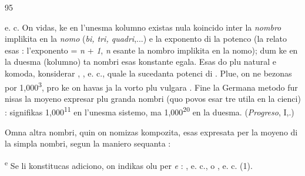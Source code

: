 \begin{VUpage}[99]{95}

\VUcontinue
e. c. On vidas, ke en l'unesma kolumno existas nula koincido\nl
inter la \textit{nombro} implikita en la \textit{nomo} (\textit{bi, tri, quadri},...) e\nl
la exponento di la potenco (la relato esas : l'exponento =\nl
\textit{n} + \textit{1}, \textit{n} esante la nombro implikita en la nomo); dum ke\nl
en la duesma (kolumno) ta nombri esas konstante egala.\nl
Esas do plu natural e komoda, konsiderar , \cc
{}, e. c., quale la sucedanta potenci di . Plue,\nl
on ne bezonas  por 1,000\textsuperscript{3}, pro ke on havas ja la\nl
vorto plu vulgara . Fine la Germana metodo fur\cc
nisas la moyeno expresar plu granda nombri (quo povos\nl
esar tre utila en la cienci) :  signifikas 1,000\textsuperscript{11} en\nl
l'unesma sistemo, ma 1,000\textsuperscript{20} en la duesma. (\textit{Progreso}, I,.)

Omna altra nombri, quin on nomizas kompozita, esas\nl
expresata per la moyeno di la simpla nombri, segun la\nl
maniero sequanta :

\textsuperscript{e} Se li konstitucas adiciono, on indikas olu per \textit{e} : \cc
{}, e. c., o \nl
{}, e. c. (1).


\end{VUpage}
